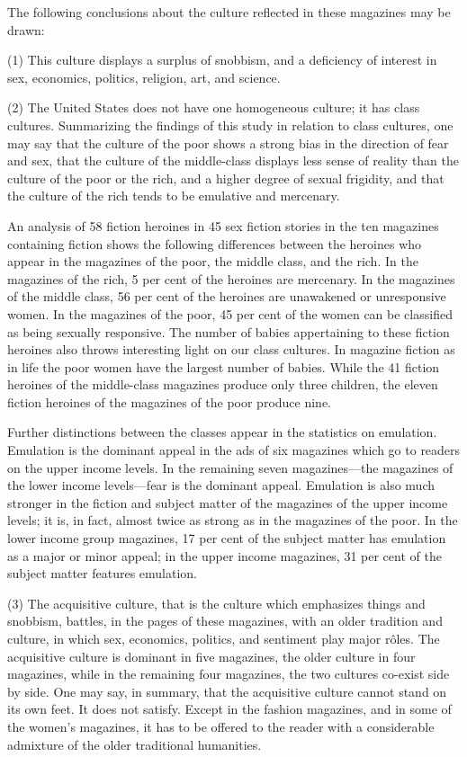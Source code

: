 \documentclass[openany,nobib]{tufte-book}
\begin{document}
The following conclusions about the culture reflected in these magazines
may be drawn:

(1) This culture displays a surplus of snobbism, and a deficiency of
interest in sex, economics, politics, religion, art, and science.

(2) The United States does not have one homogeneous culture; it has
class cultures. Summarizing the findings of this study in relation to
class cultures, one may say that the culture of the poor shows a strong
bias in the direction of fear and sex, that the culture of the
middle-class displays less sense of reality than the culture of the poor
or the rich, and a higher degree of sexual frigidity, and that the
culture of the rich tends to be emulative and mercenary.

An analysis of 58 fiction heroines in 45 sex fiction stories in the ten
magazines containing fiction shows the following differences between the
heroines who appear in the magazines of the poor, the middle class, and
the rich. In the magazines of the rich, 5 per cent of the heroines are
mercenary. In the magazines of the middle class, 56 per cent of the
heroines are unawakened or unresponsive women. In the magazines of the
poor, 45 per cent of the women can be classified as being sexually
responsive. The number of babies appertaining to these fiction heroines
also throws interesting light on our class cultures. In magazine fiction
as in life the poor women have the largest number of babies. While the
41 fiction heroines of the middle-class magazines produce only three
children, the eleven fiction heroines of the magazines of the poor
produce nine.

Further distinctions between the classes appear in the statistics on
emulation. Emulation is the dominant appeal in the ads of six magazines
which go to readers on the upper income levels. In the remaining seven
magazines---the magazines of the lower income levels---fear is the
dominant appeal. Emulation is also much stronger in the fiction and
subject matter of the magazines of the upper income levels; it is, in
fact, almost twice as strong as in the magazines of the poor. In the
lower income group magazines, 17 per cent of the subject matter has
emulation as a major or minor appeal; in the upper income magazines, 31
per cent of the subject matter features emulation.

(3) The acquisitive culture, that is the culture which emphasizes things
and snobbism, battles, in the pages of these magazines, with an older
tradition and culture, in which sex, economics, politics, and sentiment
play major r\^oles. The acquisitive culture is dominant in five magazines,
the older culture in four magazines, while in the remaining four
magazines, the two cultures co-exist side by side. One may say, in
summary, that the acquisitive culture cannot stand on its own feet. It
does not satisfy. Except in the fashion magazines, and in some of the
women's magazines, it has to be offered to the reader with a
considerable admixture of the older traditional humanities.
\end{document}
